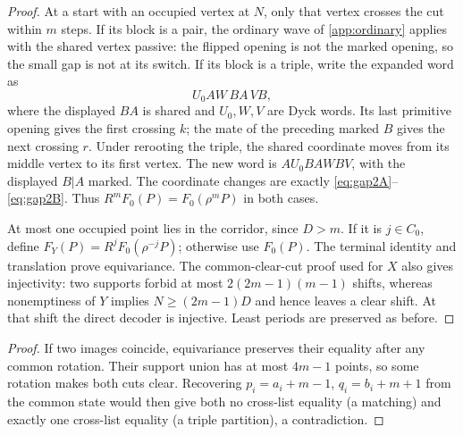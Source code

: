 \begin{proof}
At a start with an occupied vertex at $N$, only that vertex crosses the cut within $m$ steps. If its block is a pair, the ordinary wave of \cref{app:ordinary} applies with the shared vertex passive: the flipped opening is not the marked opening, so the small gap is not at its switch. If its block is a triple, write the expanded word as
\[
 U_0 A W\,B A\,V B,
\]
where the displayed $BA$ is shared and $U_0,W,V$ are Dyck words. Its last primitive opening gives the first crossing $k$; the mate of the preceding marked $B$ gives the next crossing $r$. Under rerooting the triple, the shared coordinate moves from its middle vertex to its first vertex. The new word is $A U_0 B A W B V$, with the displayed $B|A$ marked. The coordinate changes are exactly \eqref{eq:gap2A}--\eqref{eq:gap2B}. Thus $R^mF_0(P)=F_0(\rho^mP)$ in both cases.

At most one occupied point lies in the corridor, since $D>m$. If it is $j\in C_0$, define $F_Y(P)=R^jF_0(\rho^{-j}P)$; otherwise use $F_0(P)$. The terminal identity and translation prove equivariance. The common-clear-cut proof used for $X$ also gives injectivity: two supports forbid at most $2(2m-1)(m-1)$ shifts, whereas nonemptiness of $Y$ implies $N\ge(2m-1)D$ and hence leaves a clear shift. At that shift the direct decoder is injective. Least periods are preserved as before.
\end{proof}

\begin{proof}
If two images coincide, equivariance preserves their equality after any common rotation. Their support union has at most $4m-1$ points, so some rotation makes both cuts clear. Recovering $p_i=a_i+m-1$, $q_i=b_i+m+1$ from the common state would then give both no cross-list equality (a matching) and exactly one cross-list equality (a triple partition), a contradiction.
\end{proof}
